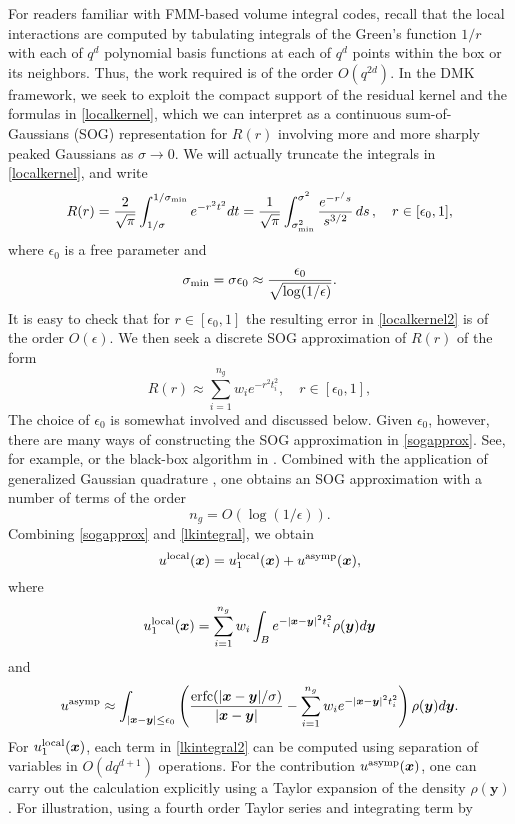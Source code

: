 \documentclass[final,letterpaper]{siamart171218}
\DeclareMathOperator\erfc{erfc}
\newcommand{\be}{\begin{equation}}
\newcommand{\ee}{\end{equation}}
\newcommand{\x}{\boldsymbol{x}}
\newcommand{\y}{\boldsymbol{y}}
\newcommand{\acron}{DMK }
\begin{document}
For readers familiar with FMM-based volume integral codes, recall that the local interactions
are computed by tabulating integrals of the Green's function $1/r$ with each of $q^d$
polynomial basis functions at each of $q^d$ points within the box or its neighbors.
Thus, the work required is of the order $O(q^{2d})$. 
In the \acron framework, we seek to exploit the compact support of the 
residual kernel and the formulas in 
\cref{localkernel}, which we can interpret as
a continuous sum-of-Gaussians (SOG) representation for $R(r)$ involving more and more
sharply peaked Gaussians as $\sigma \rightarrow 0$.
We will actually truncate the integrals in \eqref{localkernel}, and write
\be\label{localkernel2}
R(r)
= \frac{2}{\sqrt{\pi}}\int_{1/\sigma}^{1/\sigma_{\rm min}} e^{-r^2t^2}dt
= \frac{1}{\sqrt{\pi}}\int_{\sigma_{\rm min}^2}^{\sigma^2} \frac{e^{-r^/s}}{s^{3/2}} \, ds \, ,
\quad r\in [\epsilon_0,1],
\ee
where $\epsilon_0$ is a free parameter and
\be
\sigma_{\rm min}=\sigma \epsilon_0 \approx \frac{\epsilon_0}{\sqrt{\log(1/\epsilon)}}.
\ee
It is easy to check that for $r\in [\epsilon_0,1]$ the resulting error in \eqref{localkernel2}
is of the order $O(\epsilon)$.
We then seek a discrete SOG approximation of $R(r)$ of the form
\be\label{sogapprox}
R(r) \approx \sum_{i=1}^{n_g} w_i e^{-r^2 t_i^2}, \quad r\in [\epsilon_0,1],
\ee
The choice of $\epsilon_0$ is somewhat involved and discussed below. Given $\epsilon_0$, however, 
there are many ways of constructing the SOG approximation in \cref{sogapprox}. See, for example,
\cite{beylkin2010acha} or the black-box algorithm in 
\cite{greengard2018sisc}. Combined with 
the application of generalized Gaussian quadrature 
\cite{ggq2,ggq3,ggq1}, one obtains an SOG approximation with a number
of terms of the order
\be
n_g=O(\log(1/\epsilon)).
\ee
Combining \cref{sogapprox} and \cref{lkintegral}, we obtain
\be
u^{\rm local}(\x) = u_1^{\rm local}(\x) + u^{\rm asymp}(\x),
\ee
where 
\be
\label{lkintegral2}
u_1^{\rm local}(\x) =
\sum_{i=1}^{n_g} w_i \int_B e^{-|\x-\y|^2t_i^2} \rho(\y)d\y
\ee
and
\be\label{asymptoticterm}
u^{\rm asymp}\approx \int_{|\x-\y|\le \epsilon_0} \left(\frac{\erfc(|\x-\y|/\sigma)}{|\x-\y|}-
\sum_{i=1}^{n_g} w_i e^{-|\x-\y|^2t_i^2}\right) \rho(\y) d\y.
\ee
For $u_1^{\rm local}(\x)$,
each term in \cref{lkintegral2} can be computed using separation of variables 
in $O(d q^{d+1})$ operations. 
For the contribution $u^{\rm asymp}(\x)$,
one can carry out the calculation explicitly using a Taylor expansion of the density 
$\rho(\y)$. For illustration, using a fourth order Taylor series and integrating term by
\end{document}
